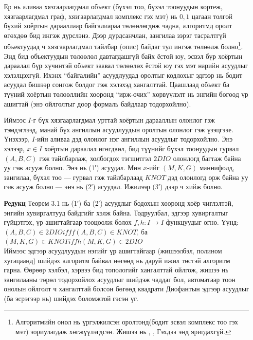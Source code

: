 Ер нь аливаа хязгаарлагдмал объект (бүхэл тоо, бүхэл тоонуудын кортеж, хязгаарлагдмал граф, хязгаарлагдмал комплекс гэх мэт) нь ${0,1}$ цагаан толгой бүхий хоёртын дарааллаар байгалиараа төлөөлөгдөж чадна, алгоритмд оролт өгөхдөө бид ингэж дүрслэнэ. Дээр дурдсанчлан, зангилаа зэрэг тасралтгүй объектуудад ч хязгаарлагдмал тайлбар (опис) байдаг тул ингэж төлөөлж болно\footnote{Алгоритмийн онол нь үргэлжилсэн оролтонд(бодит эсвэл комплекс тоо гэх мэт) зориулагдаж хөгжүүлэгдсэн. Жишээ нь \cite{BCSS98}, \cite{BC06}, Гэхдээ энд яригдахгүй.}. Энд бид объектуудын төлөөлөл давтагдашгүй байх ёстой юу, эсвэл бүр хоёртын дараалал бүр хүчинтэй объект заавал төлөөлөх ёстой юу гэх мэт нарийн асуудлыг хэлэлцэхгүй. Ихэнх “байгалийн” асуудлуудад оролтыг кодлохыг эдгээр нь бодит асуудал бишээр сонгож болдог гэж хэлэхэд хангалттай. Цаашлаад объект ба түүний хоёртын төлөөллийн хооронд “ирж-очих” хөрвүүлэлт нь энгийн бөгөөд үр ашигтай (энэ ойлголтыг доор формаль байдлаар тодорхойлно).


Иймээс $I$-г бүх хязгаарлагдмал урттай хоёртын дарааллын олонлог гэж тэмдэглээд, манай бүх ангиллын асуудлуудын оролтын олонлог гэж үзэцгээе. Үнэхээр, $I$-ийн аливаа дэд олонлог нэг ангиллын асуудлыг тодорхойлно. Энэ хэлээр, $x \in I$ хоёртын дараалал өгөгдвөл, бид түүнийг бүхэл тоонуудын гурвал $(A,B,C)$ гэж тайлбарлаж, холбогдох тэгшитгэл $2DIO$ олонлогд багтаж байна уу гэж асууж болно. Энэ нь (1′) асуудал. Мөн $x$-ийг $(M,K,G)$ маннифолд, зангилаа, бүхэл тоо — гурвал гэж тайлбарлаад $KNOT$ дэд олонлогд орж байна уу гэж асууж болно — энэ нь (2′) асуудал. Ижилээр (3′) дээр ч хийж болно.


\vspace{5mm}


\textbf{Редукц} Теорем 3.1 нь (1′) ба (2′) асуудлыг бодохын хооронд хоёр чиглэлтэй, энгийн хувиргалтууд байдгийг хэлж байна. Тодруулбал, эдгээр хувиргалтыг гүйцэтгэх, үр ашигтайгаар тооцоолж болох $f,h: I \rightarrow I$ функцуудыг өгнө. Үүнд: \\
$(A,B,C) \in 2DIO iff f(A,B,C) \in KNOT$, ба \\
$(M,K,G) \in KNOT iff h(M,K,G) \in 2DIO$ \\


Иймээс эдгээр асуудлуудын нэгийг үр ашигтайгаар (жишээлбэл, полином хугацаанд) шийдэх алгоритм байвал нөгөөд нь даруй ижил төстэй алгоритм гарна. Өөрөөр хэлбэл, хэрвээ бид топологийг хангалттай ойлгож, жишээ нь зангилааны төрөл тодорхойлох асуудлыг шийдэж чаддаг бол, автоматаар тоон онолын ойлголт ч хангалттай болсон бөгөөд квадрати Диофантын эдгээр асуудлыг (ба эсрэгээр нь) шийдэх боломжтой гэсэн үг.



